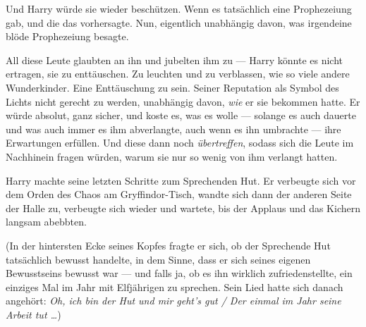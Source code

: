 Und Harry würde sie wieder beschützen. Wenn es tatsächlich eine Prophezeiung gab, und die das vorhersagte. Nun, eigentlich unabhängig davon, was irgendeine blöde Prophezeiung besagte.

All diese Leute glaubten an ihn und jubelten ihm zu — Harry könnte es nicht ertragen, sie zu enttäuschen. Zu leuchten und zu verblassen, wie so viele andere Wunderkinder. Eine Enttäuschung zu sein. Seiner Reputation als Symbol des Lichts nicht gerecht zu werden, unabhängig davon, \emph{wie} er sie bekommen hatte. Er würde absolut, ganz sicher, und koste es, was es wolle — solange es auch dauerte und was auch immer es ihm abverlangte, auch wenn es ihn umbrachte — ihre Erwartungen erfüllen. Und diese dann noch \emph{übertreffen}, sodass sich die Leute im Nachhinein fragen würden, warum sie nur so wenig von ihm verlangt hatten.


Harry machte seine letzten Schritte zum Sprechenden Hut. Er verbeugte sich vor dem Orden des Chaos am Gryffindor-Tisch, wandte sich dann der anderen Seite der Halle zu, verbeugte sich wieder und wartete, bis der Applaus und das Kichern langsam abebbten.

(In der hintersten Ecke seines Kopfes fragte er sich, ob der Sprechende Hut tatsächlich bewusst handelte, in dem Sinne, dass er sich seines eigenen Bewusstseins bewusst war — und falls ja, ob es ihn wirklich zufriedenstellte, ein einziges Mal im Jahr mit Elfjährigen zu sprechen. Sein Lied hatte sich danach angehört: \emph{Oh, ich bin der Hut und mir geht’s gut / Der einmal im Jahr seine Arbeit tut …})%

